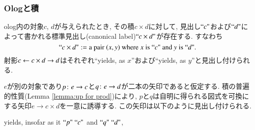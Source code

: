 
\subsubsection{Ologと積}\label{sec:ologging products}


olog内の対象$c$, $d$が与えられたとき, その積$c\times d$に対して, 見出し$\textrm{``}c\textrm{"}$および$\textrm{``}d\textrm{"}$によって書かれる標準見出し(canonical label)$\textrm{``}c\times d\textrm{"}$が存在する. すなわち$$\textrm{``}c\times d\textrm{"}:=\textrm{a pair }(x,y)\textrm{ where }x\textrm{ is }\textrm{``}c\textrm{"}\textrm{ and }y\textrm{ is }\textrm{``}d\textrm{"}.$$ 射影$c\leftarrow c\times d\rightarrow d$はそれぞれ``yields, as $x$''および``yields, as $y$''と見出し付けられる.


$e$が別の対象であり$p\colon e\rightarrow c$と$q\colon e\rightarrow d$が二本の矢印であると仮定する. 積の普遍的性質(Lemma \ref{lemma:up for prod})により, $p$と$q$は自明に得られる図式を可換にする矢印$e\to c\times d$を一意に誘導する. この矢印は以下のように見出し付けられる.
\begin{center}
yields, insofar as it $\textrm{``}p\textrm{"}\;\textrm{``}c\textrm{"}$ and $\textrm{``}q\textrm{"}\;\textrm{``}d\textrm{"}$, 
\end{center}

